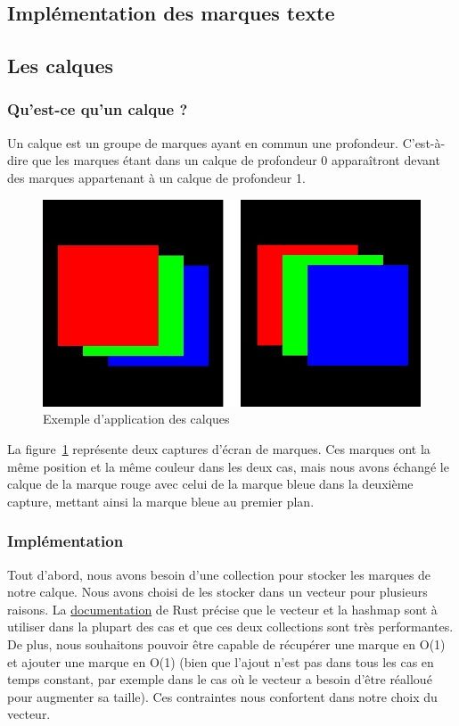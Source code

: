 \documentclass[12pt]{article}
\begin{document}
\subsection{Implémentation des marques texte}

\subsection{Les calques}
\subsubsection{Qu'est-ce qu'un calque ?}
Un calque est un groupe de marques ayant en commun une profondeur. C'est-à-dire que les marques étant dans
un calque de profondeur 0 apparaîtront devant des marques appartenant à un calque de profondeur 1.

\begin{figure}[htp]
  \centering
  \includegraphics[scale=0.8]{images/calque-exemple}
  \caption{Exemple d'application des calques}
  \label{fig:calque-ex}
\end{figure}

La figure~\ref{fig:calque-ex} représente deux captures d'écran de marques.
Ces marques ont la même position et la même couleur dans les deux cas, mais nous avons échangé le calque
de la marque rouge avec celui de la marque bleue dans la deuxième capture, mettant ainsi la marque bleue
au premier plan.

\subsubsection{Implémentation}

Tout d'abord, nous avons besoin d'une collection pour stocker les marques de notre calque.
Nous avons choisi de les stocker dans un vecteur pour plusieurs raisons.
La \href{https://doc.rust-lang.org/std/collections/index.html}{documentation} de Rust précise que le
vecteur et la hashmap sont à utiliser dans la plupart des cas et que ces deux collections sont très
performantes.
De plus, nous souhaitons pouvoir être capable de récupérer une marque en O(1) et ajouter une marque en
O(1) (bien que l'ajout n'est pas dans tous les cas en temps constant, par exemple dans le cas où le
vecteur a besoin d'être réalloué pour augmenter sa taille). Ces contraintes nous confortent dans notre
choix du vecteur.
\end{document}
